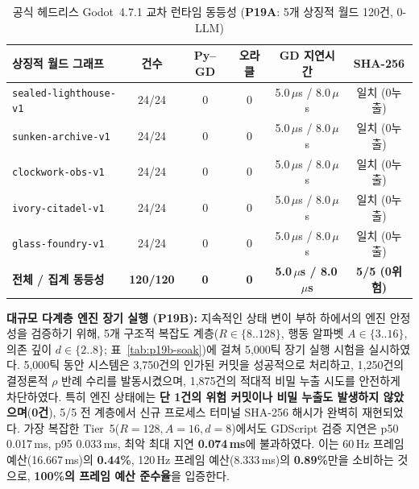 \begin{table}[!tbp]
\caption{공식 헤드리스 Godot~4.7.1 교차 런타임 동등성 (\textbf{P19A}: 5개 상징적 월드 120건, 0-LLM)}
\label{tab:p19a-parity}
\centering
\scriptsize
\setlength{\tabcolsep}{2.5pt}
\begin{tabularx}{\columnwidth}{@{}>{\raggedright\arraybackslash}Xccccc@{}}
\toprule
\textbf{상징적 월드 그래프} & \textbf{건수} & \textbf{Py--GD} & \textbf{오라클} & \textbf{GD 지연시간} & \textbf{SHA-256} \\
\midrule
\texttt{sealed-lighthouse-v1}     & 24/24 & 0 & 0 & 5.0\,$\mu$s / 8.0\,$\mu$s & 일치 (0누출) \\
\texttt{sunken-archive-v1}        & 24/24 & 0 & 0 & 5.0\,$\mu$s / 8.0\,$\mu$s & 일치 (0누출) \\
\texttt{clockwork-obs-v1}         & 24/24 & 0 & 0 & 5.0\,$\mu$s / 8.0\,$\mu$s & 일치 (0누출) \\
\texttt{ivory-citadel-v1}         & 24/24 & 0 & 0 & 5.0\,$\mu$s / 8.0\,$\mu$s & 일치 (0누출) \\
\texttt{glass-foundry-v1}         & 24/24 & 0 & 0 & 5.0\,$\mu$s / 8.0\,$\mu$s & 일치 (0누출) \\
\midrule
\textbf{전체 / 집계 동등성} & \textbf{120/120} & \textbf{0} & \textbf{0} & \textbf{5.0\,$\mu$s / 8.0\,$\mu$s} & \textbf{5/5 (0위험)} \\
\bottomrule
\end{tabularx}
\end{table}

\textbf{대규모 다계층 엔진 장기 실행 (\textbf{P19B}):} 지속적인 상태 변이 부하 하에서의 엔진 안정성을 검증하기 위해, 5개 구조적 복잡도 계층($R\in\{8..128\}$, 행동 알파벳 $A\in\{3..16\}$, 의존 깊이 $d\in\{2..8\}$; 표~\ref{tab:p19b-soak})에 걸쳐 5,000틱 장기 실행 시험을 실시하였다. 5,000틱 동안 시스템은 3,750건의 인가된 커밋을 성공적으로 처리하고, 1,250건의 결정론적 $\rho$ 반례 수리를 발동시켰으며, 1,875건의 적대적 비밀 누출 시도를 안전하게 차단하였다. 특히 엔진 상태에는 \textbf{단 1건의 위험 커밋이나 비밀 누출도 발생하지 않았으며}(\textbf{0건}), 5/5 전 계층에서 신규 프로세스 터미널 SHA-256 해시가 완벽히 재현되었다. 가장 복잡한 Tier~5($R{=}128, A{=}16, d{=}8$)에서도 GDScript 검증 지연은 p50 0.017\,ms, p95 0.033\,ms, 최악 최대 지연 \textbf{0.074\,ms}에 불과하였다. 이는 60\,Hz 프레임 예산(16.667\,ms)의 \textbf{0.44\%}, 120\,Hz 프레임 예산(8.333\,ms)의 \textbf{0.89\%}만을 소비하는 것으로, \textbf{100\%의 프레임 예산 준수율}을 입증한다.

